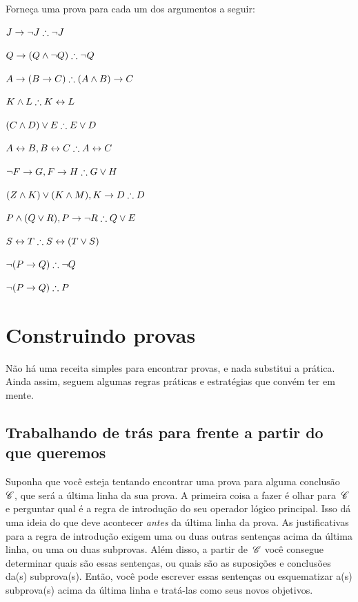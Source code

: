 \solutions
\problempart
\label{pr.solvedTFLproofs}
Forneça uma prova para cada um dos argumentos a seguir:
\begin{compactlist}
\item $J\eif\enot J \therefore \enot J$
\item $Q\eif(Q\eand\enot Q) \therefore \enot Q$
\item $A\eif (B\eif C) \therefore (A\eand B)\eif C$
\item $K\eand L \therefore K\eiff L$
\item $(C\eand D)\eor E \therefore E\eor D$
\item $A\eiff B, B\eiff C \therefore A\eiff C$
\item $\enot F\eif G, F\eif H \therefore G\eor H$
\item $(Z\eand K) \eor (K\eand M), K \eif D \therefore D$
\item $P \eand (Q\eor R), P\eif \enot R \therefore Q\eor E$
\item $S\eiff T \therefore S\eiff (T\eor S)$
\item $\enot (P \eif Q) \therefore \enot Q$
\item $\enot (P \eif Q) \therefore P$
\end{compactlist}


\chapter{Construindo provas}\label{s:stratTFL}

Não há uma receita simples para encontrar provas, e nada substitui a prática. Ainda assim, seguem algumas regras práticas e estratégias que convém ter em mente.

\section{Trabalhando de trás para frente a partir do que queremos}

Suponha que você esteja tentando encontrar uma prova para alguma conclusão~$\mathscr{C}$, que será a última linha da sua prova. A primeira coisa a fazer é olhar para~$\mathscr{C}$ e perguntar qual é a regra de introdução do seu operador lógico principal. Isso dá uma ideia do que deve acontecer \emph{antes} da última linha da prova. As justificativas para a regra de introdução exigem uma ou duas outras sentenças acima da última linha, ou uma ou duas subprovas. Além disso, a partir de~$\mathscr{C}$ você consegue determinar quais são essas sentenças, ou quais são as suposições e conclusões da(s) subprova(s). Então, você pode escrever essas sentenças ou esquematizar a(s) subprova(s) acima da última linha e tratá-las como seus novos objetivos.

